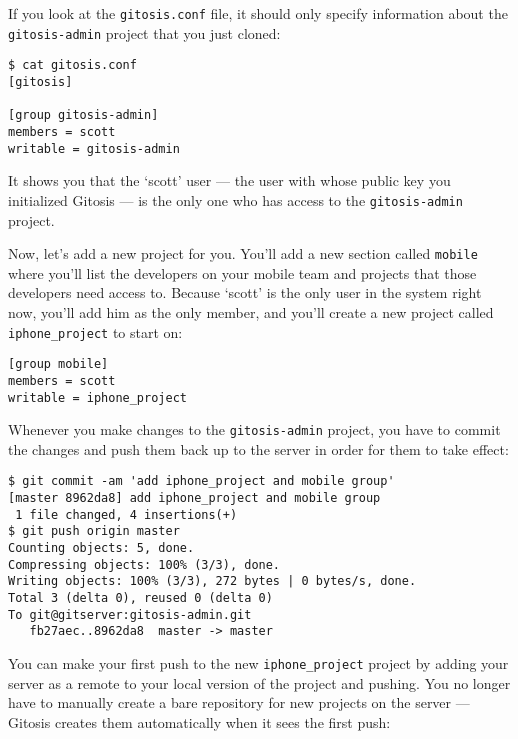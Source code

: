 \documentclass[a4paper]{book}
\newcounter{tab}[chapter]
\begin{document}
If you look at the \texttt{gitosis.conf} file, it should only specify information about the \texttt{gitosis-admin} project that you just cloned:

\begin{shaded}\begin{verbatim}
$ cat gitosis.conf
[gitosis]

[group gitosis-admin]
members = scott
writable = gitosis-admin
\end{verbatim}\end{shaded}

It shows you that the `scott' user --- the user with whose public key you initialized Gitosis --- is the only one who has access to the \texttt{gitosis-admin} project.

Now, let's add a new project for you. You'll add a new section called \texttt{mobile} where you'll list the developers on your mobile team and projects that those developers need access to. Because `scott' is the only user in the system right now, you'll add him as the only member, and you'll create a new project called \texttt{iphone\_project} to start on:

\begin{shaded}\begin{verbatim}
[group mobile]
members = scott
writable = iphone_project
\end{verbatim}\end{shaded}

Whenever you make changes to the \texttt{gitosis-admin} project, you have to commit the changes and push them back up to the server in order for them to take effect:

\begin{shaded}\begin{verbatim}
$ git commit -am 'add iphone_project and mobile group'
[master 8962da8] add iphone_project and mobile group
 1 file changed, 4 insertions(+)
$ git push origin master
Counting objects: 5, done.
Compressing objects: 100% (3/3), done.
Writing objects: 100% (3/3), 272 bytes | 0 bytes/s, done.
Total 3 (delta 0), reused 0 (delta 0)
To git@gitserver:gitosis-admin.git
   fb27aec..8962da8  master -> master
\end{verbatim}\end{shaded}

You can make your first push to the new \texttt{iphone\_project} project by adding your server as a remote to your local version of the project and pushing. You no longer have to manually create a bare repository for new projects on the server --- Gitosis creates them automatically when it sees the first push:
\end{document}
